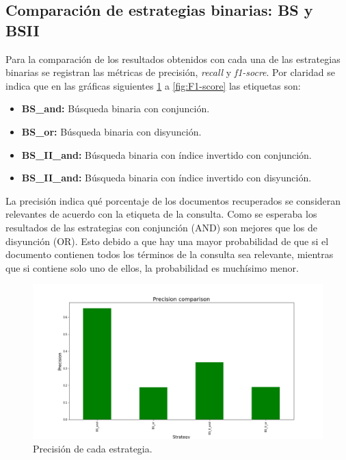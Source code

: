 \subsection{Comparación de estrategias binarias: BS y BSII}

Para la comparación de los resultados obtenidos con cada una de las estrategias binarias se registran las métricas de precisión, \textit{recall} y \textit{f1-socre}. Por claridad se indica que en las gráficas siguientes \ref{fig:Precision} a \ref{fig:F1-score} las etiquetas son:
\begin{itemize}
    \item \textbf{BS\_and:} Búsqueda binaria con conjunción.
    \item \textbf{BS\_or:} Búsqueda binaria con disyunción.
    \item \textbf{BS\_II\_and:} Búsqueda binaria con índice invertido con conjunción.
    \item \textbf{BS\_II\_and:} Búsqueda binaria con índice invertido con disyunción.
\end{itemize}

La precisión indica qué porcentaje de los documentos recuperados se consideran relevantes de acuerdo con la etiqueta de la consulta. Como se esperaba los resultados de las estrategias con conjunción (AND) son mejores que los de disyunción (OR). Esto debido a que hay una mayor probabilidad de que si el documento contienen todos los términos de la consulta sea relevante, mientras que si contiene solo uno de ellos, la probabilidad es muchísimo menor. 

\begin{figure}
    \centering
    \includegraphics[width=\textwidth]{results/images/BS_precision_comparison.png}
    \caption{Precisión de cada estrategia.}
    \label{fig:Precision}
\end{figure}


